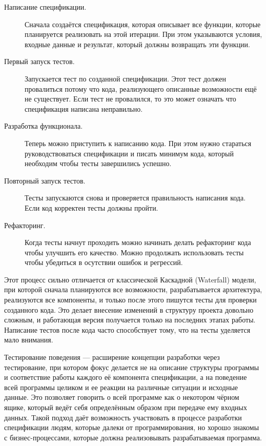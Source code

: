 \begin{description}
\item[Написание спецификации.]
Сначала создаётся спецификация, которая описывает все функции, которые планируется реализовать на этой итерации. При этом указываются условия, входные данные и результат, который должны возвращать эти функции.
\item[Первый запуск тестов.]
Запускается тест по созданной спецификации. Этот тест должен провалиться потому что кода, реализующего описанные возможности ещё не существует. Если тест не провалился, то это может означать что спецификация написана неправильно.
\item[Разработка функционала.]
Теперь можно приступить к написанию кода. При этом нужно стараться руководствоваться спецификации и писать минимум кода, который необходим чтобы тесты завершились успешно.
\item[Повторный запуск тестов.]
Тесты запускаются снова и проверяется правильность написания кода. Если код корректен тесты должны пройти.
\item[Рефакторинг.]
Когда тесты начнут проходить можно начинать делать рефакторинг кода чтобы улучшить его качество. Можно продолжать использовать тесты чтобы убедиться в осутствии ошибок и регрессий.
\end{description}

Этот процесс сильно отличается от классической Каскадной (Waterfall) модели, при которой сначала планируются все возможности, разрабатывается архитектура, реализуются все компоненты, и только после этого пишутся тесты для проверки созданного кода. Это делает внесение изменений в структуру проекта довольно сложным, и работающая версия получается только на последних этапах работы. Написание тестов после кода часто способствует тому, что на тесты уделяется мало внимания.

Тестирование поведения --- расширение концепции разработки через тестирование, при котором фокус делается не на описание структуры программы и соответствие работы каждого её компонента спецификации, а на поведение всей программы целиком и ее реакции на различные ситуации и исходные данные. Это позволяет говорить о всей программе как о некотором чёрном ящике, который ведёт себя определённым образом при передаче ему входных данных. Такой подход даёт возможность участвовать в процессе разработки спецификации людям, которые далеки от программирования, но хорошо знакомы с бизнес-процессами, которые должна реализовывать разрабатываемая программа.

